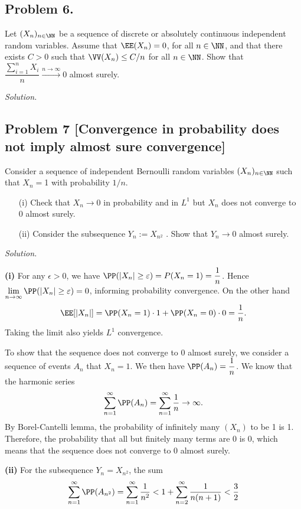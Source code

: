 \subsection*{Problem 6.} Let $(X_n)_{n\in \NN}$ be a sequence of discrete or absolutely continuous independent random variables. Assume that $\EE(X_n) = 0$, for all $n\in\NN$, and that there exists $C > 0$ such that $\VV(X_n)\le C/n$ for all $n\in\NN$. Show that $\dfrac{\sum_{i=1}^n X_i}{n}\xrightarrow{n\to\infty} 0$ almost surely.

\textit{Solution.}

\subsection*{Problem 7 [Convergence in probability does not imply almost sure convergence]} Consider a sequence of independent Bernoulli random variables $(X_n)_{n\in\NN}$ such that $X_n = $1 with probability $1/n$.
\begin{enumerate}
    \item [(i)] Check that $X_n \to 0$ in probability and in $L^1$ but $X_n$ does not converge to $0$ almost surely.
    \item [(ii)] Consider the subsequence $Y_n := X_{n^2}$ . Show that $Y_n \to 0$ almost surely.
\end{enumerate}

\textit{Solution.} 

\textbf{(i)} For any $\epsilon>0$, we have $\PP(|X_n|\ge \varepsilon) = P(X_n = 1) = \dfrac{1}{n}$. Hence $\lim\limits_{n\to\infty} \PP(|X_n|\ge \varepsilon) = 0$, informing probability convergence. On the other hand
$$\EE[|X_n|] = \PP(X_n=1) \cdot 1 + \PP(X_n=0)\cdot 0 = \dfrac{1}{n}.$$ 
Taking the limit also yields $L^1$ convergence. 

To show that the sequence does not converge to $0$ almost surely, we consider a sequence of events $A_n$ that $X_n=1$. We then have $\PP(A_n) = \dfrac{1}{n}$. We know that the harmonic series
$$\sum\limits_{n=1}^\infty \PP(A_n) = \sum\limits_{n=1}^\infty \dfrac{1}{n} \to \infty.$$
By Borel-Cantelli lemma, the probability of infinitely many $(X_n)$ to be 1 is 1. Therefore, the probability that all but finitely many terms are 0 is 0, which means that the sequence does not converge to $0$ almost surely.

\textbf{(ii)} For the subsequence $Y_n=X_{n^2}$, the sum
$$\sum\limits_{n=1}^\infty \PP(A_{n^2}) = \sum\limits_{n=1}^\infty \dfrac{1}{n^2} < 1 + \sum\limits_{n=2}^\infty\dfrac{1}{n(n+1)} < \dfrac{3}{2}$$

